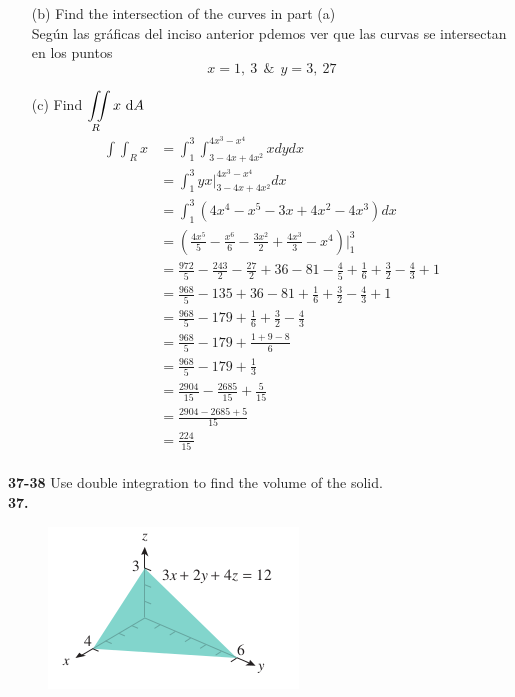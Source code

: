 \documentclass[11pt]{report}
\begin{document}
\begin{itemize}
	\item[(b)]{
		Find the intersection of the curves in part (a)\\
		Según las gráficas del inciso anterior pdemos ver que las curvas se intersectan
		en los puntos $$x=1,\ 3\ \ \&\ \ y=3,\ 27$$
	}
	\item[(c)]{
		Find $ {\displaystyle \iint \limits_R } \, x \, \, \text dA $ \\
		\begin{align*}
			\int\int_Rx &=\int_1^3\int_{3-4x+4x^2}^{4x^3-x^4}xdydx\\
				   	   &=\int_1^3yx\Big|_{3-4x+4x^2}^{4x^3-x^4}dx\\
					    &=\int_1^3 (4x^4-x^5-3x+4x^2-4x^3)dx\\
						&=(\tfrac{4x^5}{5}-\tfrac{x^6}{6}-\tfrac{3x^2}{2}+\tfrac{4x^3}{3}-x^4)\Big|_1^3\\
						&=\tfrac{972}{5}-\tfrac{243}{2}-\tfrac{27}{2}+36-81-\tfrac{4}{5}+\tfrac{1}{6}+\tfrac{3}{2}-\tfrac{4}{3}+1\\
						&=\tfrac{968}{5}-135+36-81+\tfrac{1}{6}+\tfrac{3}{2}-\tfrac{4}{3}+1\\
						&=\tfrac{968}{5}-179+\tfrac{1}{6}+\tfrac{3}{2}-\tfrac{4}{3}\\
						&=\tfrac{968}{5}-179+\tfrac{1+9-8}{6}\\
						&=\tfrac{968}{5}-179+\tfrac{1}{3}\\
						&=\tfrac{2904}{15}-\tfrac{2685}{15}+\tfrac{5}{15}\\
						&=\tfrac{2904-2685+5}{15}\\
						&=\tfrac{224}{15}\\
			\end{align*}
	}

\end{itemize}

\textbf{37-38} Use double integration to find the volume of the solid. \\

\textbf{37.} \\

\begin{figure}[h]
\includegraphics[scale=0.5]{img1.png}
\centering
\end{figure}
\end{document}
